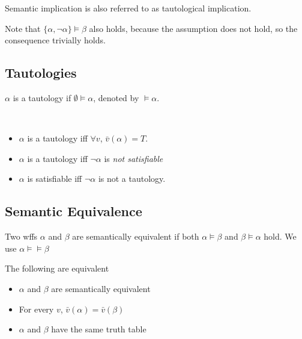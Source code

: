 Semantic implication is also referred to as tautological implication.

\begin{remark}
    Note that $\{\alpha,\neg\alpha\} \vDash \beta$ also holds, because the assumption does not hold, so the consequence trivially holds.
\end{remark}

\subsection{Tautologies}
\label{sub:Tautologies}

\begin{definition}[Tautologies]
    \label{def:Tautology}
    $\alpha$ is a tautology if $\emptyset \vDash \alpha$, denoted by $\vDash \alpha$.
\end{definition}
\begin{remark}
    ~{}
    \begin{itemize}
        \item $\alpha$ is a tautology iff $\forall v$, $\bar{v}(\alpha)=T$.
        \item $\alpha$ is a tautology iff $\neg \alpha$ is \emph{not satisfiable}
        \item $\alpha$ is satisfiable iff $\neg \alpha$ is not a tautology.
    \end{itemize}
\end{remark}

\subsection{Semantic Equivalence}
\label{sub:SemanticEquivalence}

\begin{definition}
    Two wffs $\alpha$ and $\beta$ are semantically equivalent if both $\alpha\vDash\beta$ and $\beta\vDash\alpha$ hold. We use $\alpha\vDash\models\beta$
\end{definition}

\begin{proposition}
    The following are equivalent
    \begin{itemize}
        \item $\alpha$ and $\beta$ are semantically equivalent
        \item For every $v$, $\bar{v}(\alpha)=\bar{v}(\beta)$
        \item $\alpha$ and $\beta$ have the same truth table
    \end{itemize}
\end{proposition}

